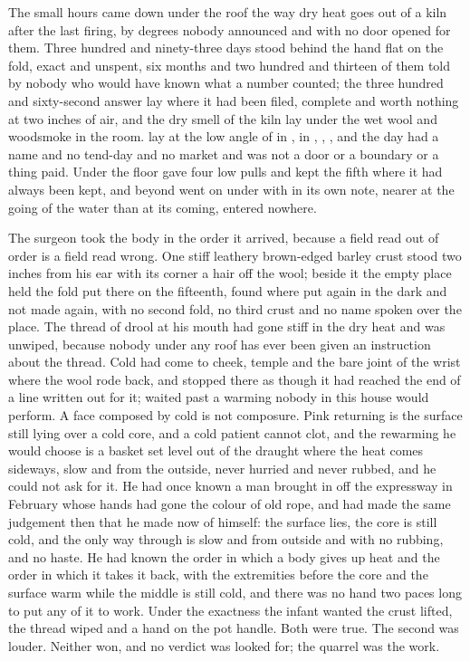 
The small hours came down under the roof the way dry heat goes out of a kiln after the last firing, by degrees nobody announced and with no door opened for them. Three hundred and ninety-three days stood behind the hand flat on the fold, exact and unspent, six months and two hundred and thirteen of them told by nobody who would have known what a number counted; the three hundred and sixty-second answer lay where it had been filed, complete and worth nothing at two inches of air, and the dry smell of the kiln lay under the wet wool and woodsmoke in the room.  lay at the low angle of  in , in , , , and the day had a name and no tend-day and no market and was not a door or a boundary or a thing paid. Under the floor  gave four low pulls and kept the fifth where it had always been kept, and beyond   went on under  with  in its own note, nearer at the going of the water than at its coming, entered nowhere.

The surgeon took the body in the order it arrived, because a field read out of order is a field read wrong. One stiff leathery brown-edged barley crust stood two inches from his ear with its corner a hair off the wool; beside it the empty place held the fold put there on the fifteenth, found where put again in the dark and not made again, with no second fold, no third crust and no name spoken over the place. The thread of drool at his mouth had gone stiff in the dry heat and was unwiped, because nobody under any roof has ever been given an instruction about the thread. Cold had come to cheek, temple and the bare joint of the wrist where the wool rode back, and stopped there as though it had reached the end of a line written out for it;  waited past a warming nobody in this house would perform. A face composed by cold is not composure. Pink returning is the surface still lying over a cold core, and a cold patient cannot clot, and the rewarming he would choose is a basket set level out of the draught where the heat comes sideways, slow and from the outside, never hurried and never rubbed, and he could not ask for it. He had once known a man brought in off the expressway in February whose hands had gone the colour of old rope, and had made the same judgement then that he made now of himself: the surface lies, the core is still cold, and the only way through is slow and from outside and with no rubbing, and no haste. He had known the order in which a body gives up heat and the order in which it takes it back, with the extremities before the core and the surface warm while the middle is still cold, and there was no hand two paces long to put any of it to work. Under the exactness the infant wanted the crust lifted, the thread wiped and a hand on the pot handle. Both were true. The second was louder. Neither won, and no verdict was looked for; the quarrel was the work.

